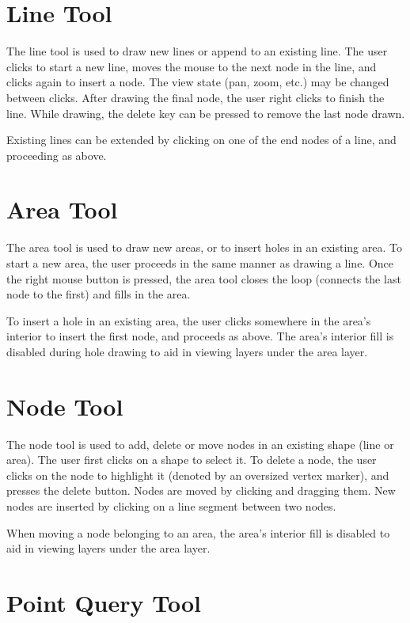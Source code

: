 \documentclass{openevreport}
\begin{document}
\section{Line Tool}

The line tool is used to draw new lines or append to an existing
line.  The user clicks to start a new line, moves the mouse to the
next node in the line, and clicks again to insert a node.  The view
state (pan, zoom, etc.) may be changed between clicks.  After drawing
the final node, the user right clicks to finish the line.  While
drawing, the delete key can be pressed to remove the last node drawn.

Existing lines can be extended by clicking on one of the end nodes of
a line, and proceeding as above.

\section{Area Tool}

The area tool is used to draw new areas, or to insert holes in an
existing area.  To start a new area, the user proceeds in the same
manner as drawing a line.  Once the right mouse button is pressed, the 
area tool closes the loop (connects the last node to the first) and
fills in the area.

To insert a hole in an existing area, the user clicks somewhere in the 
area's interior to insert the first node, and proceeds as above.  The
area's interior fill is disabled during hole drawing to aid in viewing
layers under the area layer.

\section{Node Tool}

The node tool is used to add, delete or move nodes in an existing
shape (line or area).  The user first clicks on a shape to select it.
To delete a node, the user clicks on the node to highlight it (denoted
by an oversized vertex marker), and presses the delete button.  Nodes
are moved by clicking and dragging them.  New nodes are inserted by
clicking on a line segment between two nodes.  

When moving a node belonging to an area, the area's interior fill is
disabled to aid in viewing layers under the area layer.

\section{Point Query Tool}
\end{document}
